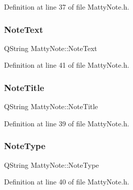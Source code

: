 Definition at line 37 of file Matty\+Note.\+h.

\hypertarget{classMattyNote_ab54fa825ed3ce8081befdb0c391d682b}{}\label{classMattyNote_ab54fa825ed3ce8081befdb0c391d682b} 
\subsubsection{\texorpdfstring{Note\+Text}{NoteText}}
{\footnotesize\ttfamily Q\+String Matty\+Note\+::\+Note\+Text\hspace{0.3cm}{\ttfamily [private]}}



Definition at line 41 of file Matty\+Note.\+h.

\hypertarget{classMattyNote_a185f1f13eeb93acb237b9db7b4c94229}{}\label{classMattyNote_a185f1f13eeb93acb237b9db7b4c94229} 
\subsubsection{\texorpdfstring{Note\+Title}{NoteTitle}}
{\footnotesize\ttfamily Q\+String Matty\+Note\+::\+Note\+Title\hspace{0.3cm}{\ttfamily [private]}}



Definition at line 39 of file Matty\+Note.\+h.

\hypertarget{classMattyNote_a0b45b382884fac5b651ab1ce155a2c13}{}\label{classMattyNote_a0b45b382884fac5b651ab1ce155a2c13} 
\subsubsection{\texorpdfstring{Note\+Type}{NoteType}}
{\footnotesize\ttfamily Q\+String Matty\+Note\+::\+Note\+Type\hspace{0.3cm}{\ttfamily [private]}}



Definition at line 40 of file Matty\+Note.\+h.

\hypertarget{classMattyNote_ad116cdf301951c8c93ee2a81a0df8647}{}\label{classMattyNote_ad116cdf301951c8c93ee2a81a0df8647} 
